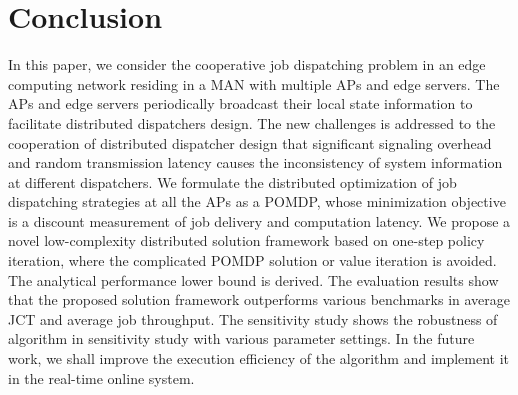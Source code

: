\section{Conclusion}
\label{sec:conclusion}
In this paper, we consider the cooperative job dispatching problem in an edge computing network residing in a MAN with multiple APs and edge servers.
The APs and edge servers periodically broadcast their local state information to facilitate distributed dispatchers design.
The new challenges is addressed to the cooperation of distributed dispatcher design that significant signaling overhead and random transmission latency causes the inconsistency of system information at different dispatchers.
We formulate the distributed optimization of job dispatching strategies at all the APs as a POMDP, whose minimization objective is a discount measurement of job delivery and computation latency.
We propose a novel low-complexity distributed solution framework based on one-step policy iteration, where the complicated POMDP solution or value iteration is avoided.
The analytical performance lower bound is derived.
The evaluation results show that the proposed solution framework outperforms various benchmarks in average JCT and average job throughput.
The sensitivity study shows the robustness of algorithm in sensitivity study with various parameter settings.
In the future work, we shall improve the execution efficiency of the algorithm and implement it in the real-time online system. 